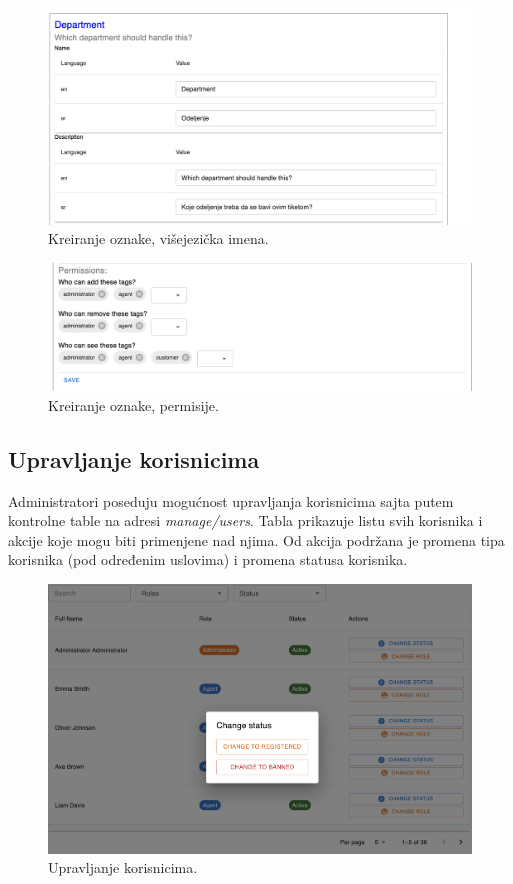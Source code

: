 \documentclass[12pt,oneside]{memoir}
\begin{document}
\begin{figure}[h]
  \centering
  \includegraphics[width=1\textwidth]{docs/images/ch_1/tag-mgmt-head.png} 
  \caption{Kreiranje oznake, višejezička imena.}
\end{figure}

\begin{figure}[h]
  \centering
  \includegraphics[width=1\textwidth]{docs/images/ch_1/tag-mgmt-permissions.png} 
  \caption{Kreiranje oznake, permisije.}
\end{figure}

\newpage
\subsection{Upravljanje korisnicima}

Administratori poseduju mogućnost upravljanja korisnicima sajta putem kontrolne table na adresi \textit{manage/users}. Tabla prikazuje listu svih korisnika i akcije koje mogu biti primenjene nad njima. Od akcija podržana je promena tipa korisnika (pod određenim uslovima) i promena statusa korisnika.

\begin{figure}[h]
  \centering
  \includegraphics[width=1\textwidth]{docs/images/ch_1/manage-users-preview.png} 
  \caption{Upravljanje korisnicima.}
\end{figure}
\end{document}
